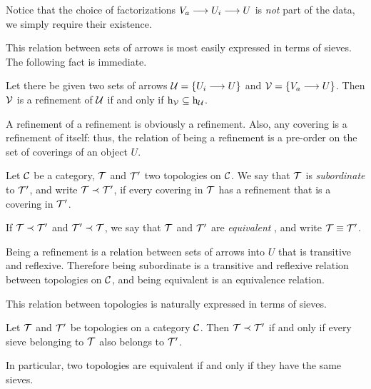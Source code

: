 \begin{2   CONTRAVARIANT FUNCTORS}
\begin{2.3 Sheaves in Grothendieck topologies}
Notice that the choice of factorizations $V_a \arr U_i \arr U$ is \emph{not} part of the data, we simply require their existence.

This relation between sets of arrows is most easily expressed in terms of sieves. The following fact is immediate.

\begin{proposition}\label{prop:funnychar-refinement}%
Let there be given two sets of arrows $\mathcal{U} = \{U_i \longrightarrow U\}$ and $\cV = \{V_a \arr U\}$. Then $\mathcal{V}$ is a refinement of $\mathcal{U}$ if and only if $\mathrm{h}_{\mathcal{V}} \subseteq \mathrm{h}_{\mathcal{U}}$.
\end{proposition}

A refinement of a refinement is obviously a refinement. Also, any covering is a refinement of itself: thus, the relation of being a refinement is a pre-order on the set of coverings of an object $U$.

\begin{definition}\label{def:same-sheaves}
Let $\mathcal{C}$ be a category, $\mathcal{T}$ and $\mathcal{T}'$ two topologies on $\mathcal{C}$. We say that $\mathcal{T}$ is \emph{subordinate}%
%
 to $\mathcal{T}'$, and write $\mathcal{T} \prec \mathcal{T}'$, if every covering in $\mathcal{T}$ has a refinement that is a covering in $\mathcal{T}'$.

If $\mathcal{T} \prec \mathcal{T}'$ and $\mathcal{T}' \prec \mathcal{T}$, we say that $\mathcal{T}$ and $\mathcal{T}'$ are \emph{equivalent}%
%
, and write $\mathcal{T} \equiv \mathcal{T}'$.
\end{definition}

Being a refinement is a relation between sets of arrows into $U$ that is transitive and reflexive. Therefore being subordinate is a transitive and reflexive relation between topologies on $\mathcal{C}$, and being equivalent is an equivalence relation.

This relation between topologies is naturally expressed in terms of sieves.

\begin{proposition}\label{prop:funnychar-subordinate}%
%
Let $\mathcal{T}$ and $\mathcal{T}'$ be topologies on a category $\mathcal{C}$. Then $\mathcal{T} \prec \mathcal{T}'$ if and only if every sieve belonging to $\mathcal{T}$ also belongs to $\mathcal{T}'$.

In particular, two topologies are equivalent if and only if they have the same sieves.
\end{proposition}


\end{2.3 Sheaves in Grothendieck topologies}
\end{2   CONTRAVARIANT FUNCTORS}
